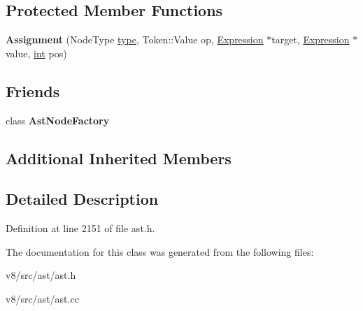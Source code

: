 \subsection*{Protected Member Functions}
\begin{DoxyCompactItemize}
\item 
\mbox{\label{classv8_1_1internal_1_1Assignment_af08a3c53836fdf472e17bd75ba6a8507}} 
{\bfseries Assignment} (Node\+Type \mbox{\hyperlink{classstd_1_1conditional_1_1type}{type}}, Token\+::\+Value op, \mbox{\hyperlink{classv8_1_1internal_1_1Expression}{Expression}} $\ast$target, \mbox{\hyperlink{classv8_1_1internal_1_1Expression}{Expression}} $\ast$value, \mbox{\hyperlink{classint}{int}} pos)
\end{DoxyCompactItemize}
\subsection*{Friends}
\begin{DoxyCompactItemize}
\item 
\mbox{\label{classv8_1_1internal_1_1Assignment_a8d587c8ad3515ff6433eb83c578e795f}} 
class {\bfseries Ast\+Node\+Factory}
\end{DoxyCompactItemize}
\subsection*{Additional Inherited Members}


\subsection{Detailed Description}


Definition at line 2151 of file ast.\+h.



The documentation for this class was generated from the following files\+:\begin{DoxyCompactItemize}
\item 
v8/src/ast/ast.\+h\item 
v8/src/ast/ast.\+cc\end{DoxyCompactItemize}
